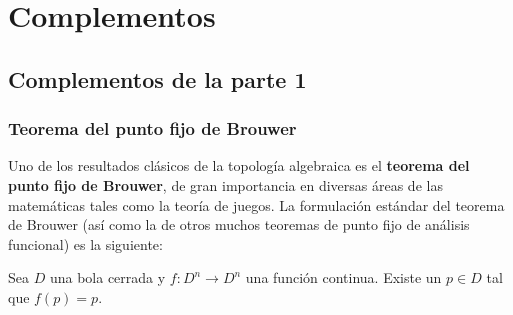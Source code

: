 \setchapterpreamble[u]{\margintoc}

\chapter{Complementos}
\section{Complementos de la parte 1}
\subsection{Teorema del punto fijo de Brouwer}
Uno de los resultados clásicos de la topología algebraica es el
\textbf{teorema del punto fijo de Brouwer}, de gran importancia en diversas
áreas de las matemáticas tales como la teoría de juegos. La formulación
estándar del teorema de Brouwer (así como la de otros muchos teoremas de punto
fijo de análisis funcional) es la siguiente:

\begin{theorem}
Sea $D$ una bola cerrada y  $f: D^n \to D^n$ una función continua. Existe un
$p \in D$ tal que $f(p)=p$.
\end{theorem}

